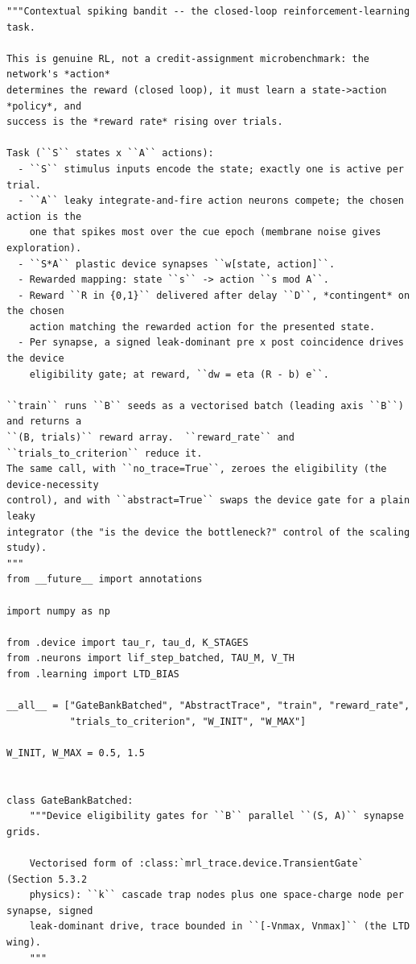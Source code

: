 \begin{lstlisting}[caption={mrl\_trace/bandit.py},label={lst:siox-src-bandit}]
"""Contextual spiking bandit -- the closed-loop reinforcement-learning task.

This is genuine RL, not a credit-assignment microbenchmark: the network's *action*
determines the reward (closed loop), it must learn a state->action *policy*, and
success is the *reward rate* rising over trials.

Task (``S`` states x ``A`` actions):
  - ``S`` stimulus inputs encode the state; exactly one is active per trial.
  - ``A`` leaky integrate-and-fire action neurons compete; the chosen action is the
    one that spikes most over the cue epoch (membrane noise gives exploration).
  - ``S*A`` plastic device synapses ``w[state, action]``.
  - Rewarded mapping: state ``s`` -> action ``s mod A``.
  - Reward ``R in {0,1}`` delivered after delay ``D``, *contingent* on the chosen
    action matching the rewarded action for the presented state.
  - Per synapse, a signed leak-dominant pre x post coincidence drives the device
    eligibility gate; at reward, ``dw = eta (R - b) e``.

``train`` runs ``B`` seeds as a vectorised batch (leading axis ``B``) and returns a
``(B, trials)`` reward array.  ``reward_rate`` and ``trials_to_criterion`` reduce it.
The same call, with ``no_trace=True``, zeroes the eligibility (the device-necessity
control), and with ``abstract=True`` swaps the device gate for a plain leaky
integrator (the "is the device the bottleneck?" control of the scaling study).
"""
from __future__ import annotations

import numpy as np

from .device import tau_r, tau_d, K_STAGES
from .neurons import lif_step_batched, TAU_M, V_TH
from .learning import LTD_BIAS

__all__ = ["GateBankBatched", "AbstractTrace", "train", "reward_rate",
           "trials_to_criterion", "W_INIT", "W_MAX"]

W_INIT, W_MAX = 0.5, 1.5


class GateBankBatched:
    """Device eligibility gates for ``B`` parallel ``(S, A)`` synapse grids.

    Vectorised form of :class:`mrl_trace.device.TransientGate` (Section 5.3.2
    physics): ``k`` cascade trap nodes plus one space-charge node per synapse, signed
    leak-dominant drive, trace bounded in ``[-Vnmax, Vnmax]`` (the LTD wing).
    """


\end{lstlisting}

